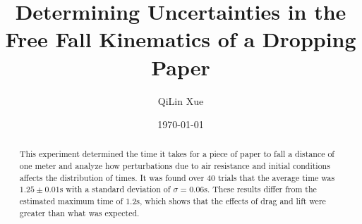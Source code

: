 \documentclass[%
 reprint,
 amsmath,amssymb,
 aps,
]{revtex4-2}
\begin{document}

\title{Determining Uncertainties in the Free Fall Kinematics of a Dropping Paper}%

\author{QiLin Xue}

\date{\today}%

\begin{abstract}
This experiment determined the time it takes for a piece of paper to fall a distance of one meter and analyze how perturbations due to air resistance and initial conditions affects the distribution of times. It was found over $40$ trials that the average time was $1.25 \pm 0.01 \si{\second}$ with a standard deviation of $\sigma=0.06\si{\second}$. These results differ from the estimated maximum time of $1.2\si{\second}$, which shows that the effects of drag and lift were greater than what was expected.
\end{abstract}

\maketitle

\end{document}

